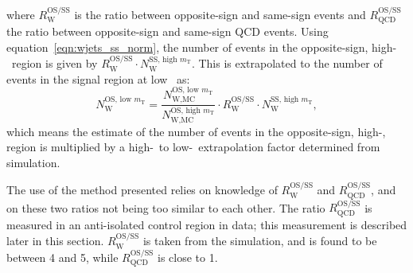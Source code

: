 where $R_{\text{W}}^{\text{OS/SS}}$ is the ratio between opposite-sign and same-sign \Wjets events
and $R_{\text{QCD}}^{\text{OS/SS}}$ the ratio between opposite-sign and same-sign QCD events. Using 
equation~\ref{eqn:wjets_ss_norm}, the number of \Wjets events in the
opposite-sign, high-\mT~region is given by $R_{\text{W}}^{\text{OS/SS}}\cdot N_{\text{W}}^{\text{SS, high } m_{\text{T}}}$. 
This is extrapolated to the number of \Wjets events in the signal region at low \mT~as:
\begin{equation}\label{eqn:wjets_os_norm}
N_{\text{W}}^{\text{OS, low } m_{\text{T}}} = \frac{N_{\text{W,MC}}^{\text{OS, low } m_{\text{T}}}}{N_{\text{W,MC}}^{\text{OS, high } m_{\text{T}}}}\cdot R_{\text{W}}^{\text{OS/SS}} \cdot N_{\text{W}}^{\text{SS, high }m_{\text{T}}},
\end{equation}
which means the estimate of the number of \Wjets events in the opposite-sign, high-\mT, region
is multiplied by a high-\mT~to low-\mT~extrapolation factor determined from simulation.

The use of the method presented relies on knowledge of $R_{\text{W}}^{\text{OS/SS}}$ and 
$R_{\text{QCD}}^{\text{OS/SS}}$, and on these two ratios not being too similar to each other. 
The ratio $R_{\text{QCD}}^{\text{OS/SS}}$ is measured in an anti-isolated
control region in data; this measurement is described later in this section. $R_{\text{W}}^{\text{OS/SS}}$ is 
taken from the \Wjets simulation, and is found to be between 4 and 5, while $R_{\text{QCD}}^{\text{OS/SS}}$
is close to 1.

